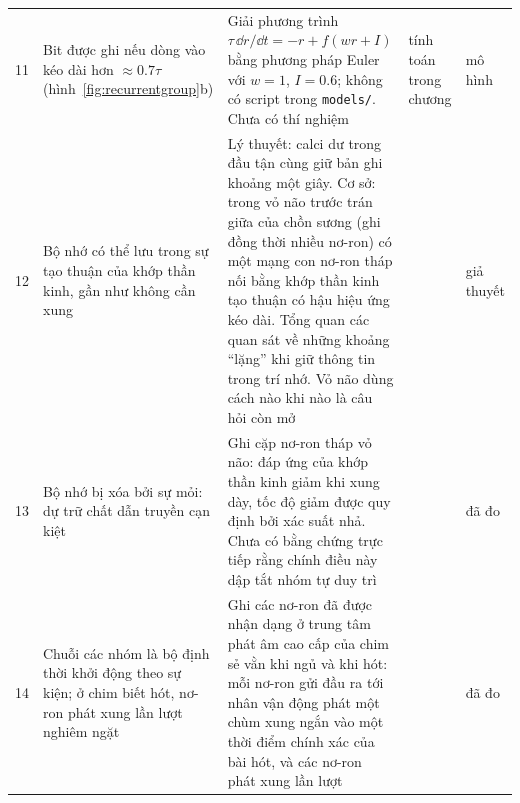 {\begin{longtable}{>{\raggedright}p{0.5cm}>{\raggedright}p{4.0cm}>{\raggedright}p{5.6cm}>{\raggedright}p{2.3cm}>{\raggedright\arraybackslash}p{1.7cm}}
11 & Bit được ghi nếu dòng vào kéo dài hơn $\approx0.7\tau$ (hình~\ref{fig:recurrentgroup}b) & Giải phương trình $\tau\,\dd r/\dd t=-r+f(wr+I)$ bằng phương pháp Euler với $w=1$, $I=0.6$; không có script trong \texttt{models/}. Chưa có thí nghiệm & tính toán trong chương & mô hình \\
12 & Bộ nhớ có thể lưu trong sự tạo thuận của khớp thần kinh, gần như không cần xung & Lý thuyết: calci dư trong đầu tận cùng giữ bản ghi khoảng một giây. Cơ sở: trong vỏ não trước trán giữa của chồn sương (ghi đồng thời nhiều nơ-ron) có một mạng con nơ-ron tháp nối bằng khớp thần kinh tạo thuận có hậu hiệu ứng kéo dài. Tổng quan các quan sát về những khoảng ``lặng'' khi giữ thông tin trong trí nhớ. Vỏ não dùng cách nào khi nào là câu hỏi còn mở & \cite{Mongillo2008,WangMarkram2006,Stokes2015} & giả thuyết \\
13 & Bộ nhớ bị xóa bởi sự mỏi: dự trữ chất dẫn truyền cạn kiệt & Ghi cặp nơ-ron tháp vỏ não: đáp ứng của khớp thần kinh giảm khi xung dày, tốc độ giảm được quy định bởi xác suất nhả. Chưa có bằng chứng trực tiếp rằng chính điều này dập tắt nhóm tự duy trì & \cite{Tsodyks1997} & đã đo \\
14 & Chuỗi các nhóm là bộ định thời khởi động theo sự kiện; ở chim biết hót, nơ-ron phát xung lần lượt nghiêm ngặt & Ghi các nơ-ron đã được nhận dạng ở trung tâm phát âm cao cấp của chim sẻ vằn khi ngủ và khi hót: mỗi nơ-ron gửi đầu ra tới nhân vận động phát một chùm xung ngắn vào một thời điểm chính xác của bài hót, và các nơ-ron phát xung lần lượt & \cite{Hahnloser2002} & đã đo \\
\bottomrule
\end{longtable}}
